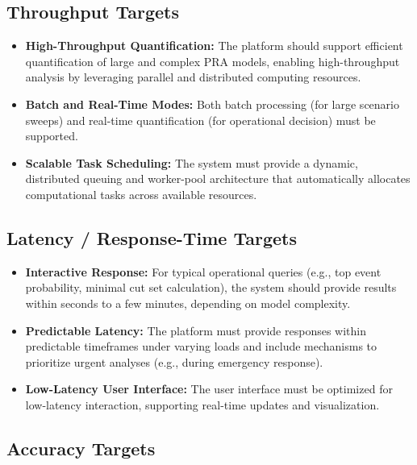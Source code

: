 \subsection{Throughput Targets}
\label{subsec:throughput-targets}

\begin{itemize}
    \item \textbf{High-Throughput Quantification:} The platform should support efficient quantification of large and complex PRA models, enabling high-throughput analysis by leveraging parallel and distributed computing resources.
    \item \textbf{Batch and Real-Time Modes:} Both batch processing (for large scenario sweeps) and real-time quantification (for operational decision) must be supported.
    \item \textbf{Scalable Task Scheduling:} The system must provide a dynamic, distributed queuing and worker-pool architecture that automatically allocates computational tasks across available resources.
\end{itemize}

\subsection{Latency / Response-Time Targets}
\label{subsec:latency-targets}

\begin{itemize}
    \item \textbf{Interactive Response:} For typical operational queries (e.g., top event probability, minimal cut set calculation), the system should provide results within seconds to a few minutes, depending on model complexity.
    \item \textbf{Predictable Latency:} The platform must provide responses within predictable timeframes under varying loads and include mechanisms to prioritize urgent analyses (e.g., during emergency response).
    \item \textbf{Low-Latency User Interface:} The user interface must be optimized for low-latency interaction, supporting real-time updates and visualization.
\end{itemize}

\subsection{Accuracy Targets}
\label{subsec:accuracy-targets}

